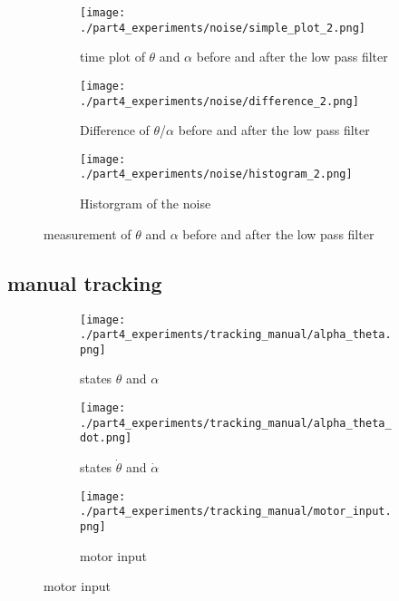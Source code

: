 	
	
	\begin{figure}[H]
		\centering
		\begin{subfigure}[b]{0.40\textwidth}
			\texttt{[image: ./part4\_experiments/noise/simple\_plot\_2.png]}
			\caption{time plot of $\theta$ and $\alpha$ before and after the low pass filter}
			\label{fig:time plot theta and alpha}
		\end{subfigure}
		\begin{subfigure}[b]{0.40\textwidth}
			\texttt{[image: ./part4\_experiments/noise/difference\_2.png]}
			\caption{Difference of $\theta$/$\alpha$ before and after the low pass filter}
			\label{fig:time plot noise}
		\end{subfigure}
		\begin{subfigure}[b]{0.40\textwidth}
			\texttt{[image: ./part4\_experiments/noise/histogram\_2.png]}
			\caption{Historgram of the noise}
			\label{fig:hist noise}
		\end{subfigure}
		\caption{measurement of $\theta$ and $\alpha$ before and after the low pass filter}
	\end{figure}

\subsection{manual tracking}
	\begin{figure}[H]
		\centering
		\begin{subfigure}[b]{0.45\textwidth}
			\texttt{[image: ./part4\_experiments/tracking\_manual/alpha\_theta.png]}
			\caption{states $\theta$ and $\alpha$}
		\end{subfigure}
		\begin{subfigure}[b]{0.45\textwidth}
			\texttt{[image: ./part4\_experiments/tracking\_manual/alpha\_theta\_dot.png]}
			\caption{states $\dot{\theta}$ and $\dot{\alpha}$}
		\end{subfigure}
		\begin{subfigure}[b]{0.45\textwidth}
			\texttt{[image: ./part4\_experiments/tracking\_manual/motor\_input.png]}
			\caption{motor input}
		\end{subfigure}
	\end{figure}
